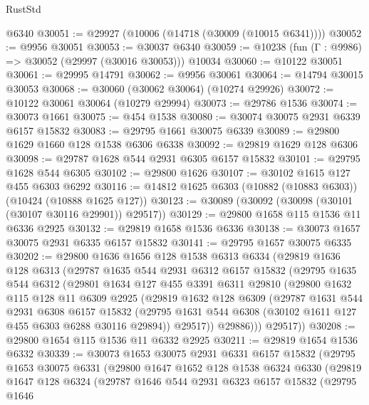 \begin{lexlean}{RustStd}
\begin{coremodule}
    @6340
@30051 := @29927 (@10006 (@14718 (@30009 (@10015 @6341))))
@30052 := @9956 @30051
@30053 := @30037 @6340
@30059 := @10238 (fun (Γ : @9986) => @30052 (@29997 (@30016 @30053))) @10034
@30060 := @10122 @30051
@30061 := @29995 @14791
@30062 := @9956 @30061
@30064 := @14794 @30015 @30053
@30068 := @30060 (@30062 @30064) (@10274 @29926)
@30072 := @10122 @30061 @30064 (@10279 @29994)
@30073 := @29786 @1536
@30074 := @30073 @1661
@30075 := @454 @1538
@30080 := @30074 @30075 @2931 @6339 @6157 @15832
@30083 := @29795 @1661 @30075 @6339
@30089 := @29800 @1629 @1660 @128 @1538 @6306 @6338
@30092 := @29819 @1629 @128 @6306
@30098 := @29787 @1628 @544 @2931 @6305 @6157 @15832
@30101 := @29795 @1628 @544 @6305
@30102 := @29800 @1626
@30107 := @30102 @1615 @127 @455 @6303 @6292
@30116 := @14812 @1625 @6303 (@10882 (@10883 @6303)) (@10424 (@10888 @1625 @127))
@30123 := @30089 (@30092 (@30098 (@30101 (@30107 @30116 @29901)) @29517))
@30129 := @29800 @1658 @115 @1536 @11 @6336 @2925
@30132 := @29819 @1658 @1536 @6336
@30138 := @30073 @1657 @30075 @2931 @6335 @6157 @15832
@30141 := @29795 @1657 @30075 @6335
@30202 := @29800
    @1636
    @1656
    @128
    @1538
    @6313
    @6334
    (@29819
      @1636
      @128
      @6313
      (@29787
        @1635
        @544
        @2931
        @6312
        @6157
        @15832
        (@29795
          @1635
          @544
          @6312
          (@29801
            @1634
            @127
            @455
            @3391
            @6311
            @29810
            (@29800
              @1632
              @115
              @128
              @11
              @6309
              @2925
              (@29819
                @1632
                @128
                @6309
                (@29787
                  @1631
                  @544
                  @2931
                  @6308
                  @6157
                  @15832
                  (@29795 @1631 @544 @6308 (@30102 @1611 @127 @455 @6303 @6288 @30116 @29894))
                  @29517))
              @29886)))
        @29517))
@30208 := @29800 @1654 @115 @1536 @11 @6332 @2925
@30211 := @29819 @1654 @1536 @6332
@30339 := @30073
    @1653
    @30075
    @2931
    @6331
    @6157
    @15832
    (@29795
      @1653
      @30075
      @6331
      (@29800
        @1647
        @1652
        @128
        @1538
        @6324
        @6330
        (@29819
          @1647
          @128
          @6324
          (@29787
            @1646
            @544
            @2931
            @6323
            @6157
            @15832
            (@29795
              @1646

\end{coremodule}
\end{lexlean}
